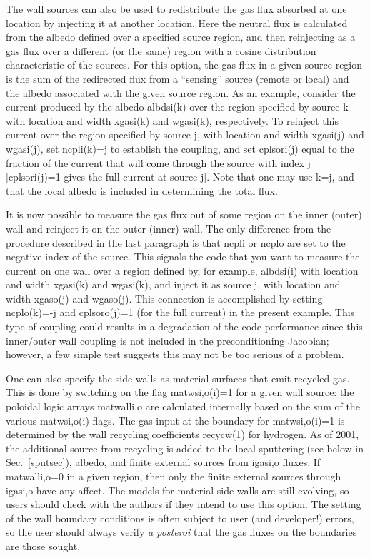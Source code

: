 \documentclass [12pt]{article}
\begin{document}
The wall sources can also be used to redistribute the gas flux absorbed at one
location by injecting it at another location.  Here the neutral flux is
calculated from the albedo defined over a specified source region, and then
reinjecting as a gas flux over a different (or the same) region with a cosine
distribution characteristic of the sources.  For this option, the gas flux in
a given source region is the sum of the redirected flux from a ``sensing''
source (remote or local) and the albedo associated with the given source
region.  As an example, consider the current produced by the albedo albdsi(k)
over the region specified by source k with location and width xgasi(k) and
wgasi(k), respectively.  To reinject this current over the region specified by
source j, with location and width xgasi(j) and wgasi(j), set ncpli(k)=j to
establish the coupling, and set cplsori(j) equal to the fraction of the
current that will come through the source with index j [cplsori(j)=1 gives the
full current at source j]. Note that one may use k=j, and that the local
albedo is included in determining the total flux.

It is now possible to measure the gas flux out of some region on the inner
(outer) wall and reinject it on the outer (inner) wall.  The only difference
from the procedure described in the last paragraph is that ncpli or ncplo are
set to the negative index of the source.  This signals the code that you want
to measure the current on one wall over a region defined by, for example,
albdsi(i) with location and width xgasi(k) and wgasi(k), and inject it as
source j, with location and width xgaso(j) and wgaso(j).  This connection is
accomplished by setting ncplo(k)=-j and cplsoro(j)=1 (for the full current) in
the present example.  This type of coupling could results in a degradation of
the code performance since this inner/outer wall coupling is not included in
the preconditioning Jacobian; however, a few simple test suggests this may not
be too serious of a problem.

One can also specify the side walls as material surfaces that emit recycled
gas. This is done by switching on the flag {\sf matwsi,o(i)=1} for a given
wall source: the poloidal logic arrays {\sf matwalli,o} are calculated
internally based on the sum of the various {\sf matwsi,o(i)} flags. The gas
input at the boundary for {\sf matwsi,o(i)=1} is determined by the wall
recycling coefficients {\sf recycw(1)} for hydrogen.  As of 2001, the
additional source from recycling is added to the local sputtering (see below
in Sec.~\ref{sputsec}), albedo, and finite external sources from {\sf igasi,o}
fluxes. If {\sf matwalli,o=0} in a given region, then only the finite
external sources through {\sf igasi,o} have any affect. The models for
material side walls are still evolving, so users should check with the authors
if they intend to use this option.  The setting of the wall boundary
conditions is often subject to user (and developer!) errors, so the user
should always verify {\it a posteroi} that the gas fluxes on the boundaries
are those sought.
\end{document}
